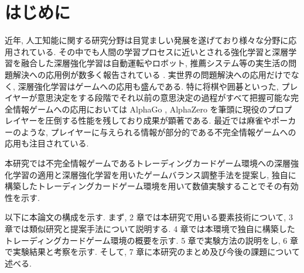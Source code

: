 \newpage
\changeindent{0cm}
\section{はじめに}
\changeindent{2cm}

近年, 人工知能に関する研究分野は目覚ましい発展を遂げており様々な分野に応用されている. その中でも人間の学習プロセスに近いとされる強化学習と深層学習を融合した深層強化学習は自動運転やロボット, 推薦システム等の実生活の問題解決への応用例が数多く報告されている \cite{Vehicle}\cite{robotics}\cite{recommendation}. 
実世界の問題解決への応用だけでなく, 深層強化学習はゲームへの応用も盛んである.
特に将棋や囲碁といった, プレイヤーが意思決定をする段階でそれ以前の意思決定の過程がすべて把握可能な完全情報ゲームへの応用においては AlphaGo \cite{AlphaGo}, AlphaZero \cite{AlphaZero} を筆頭に現役のプロプレイヤーを圧倒する性能を残しており成果が顕著である. 
最近では麻雀やポーカーのような, プレイヤーに与えられる情報が部分的である不完全情報ゲームへの応用も注目されている.
\par
本研究では不完全情報ゲームであるトレーディングカードゲーム環境への深層強化学習の適用と深層強化学習を用いたゲームバランス調整手法を提案し, 独自に構築したトレーディングカードゲーム環境を用いて数値実験することでその有効性を示す. 
\par
以下に本論文の構成を示す.  まず, 2 章では本研究で用いる要素技術について, 3 章では類似研究と提案手法について説明する. 4 章では本環境で独自に構築したトレーディングカードゲーム環境の概要を示す. 5 章で実験方法の説明をし, 6 章で実験結果と考察を示す. そして, 7 章に本研究のまとめ及び今後の課題について述べる.